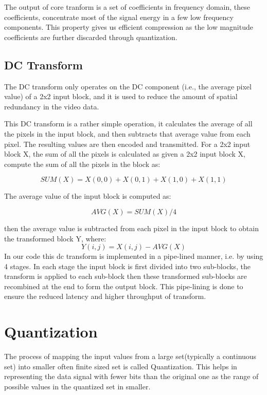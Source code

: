 The output of core tranform is a set of coefficients in frequency domain, these coefficients, concentrate most of the signal energy in a few low frequency components. This property gives us efficient compression as the low magnitude coefficients are further discarded through quantization.

\subsection{DC Transform}
The DC transform only operates on the DC component (i.e., the average pixel value) of a 2x2 input block, and it is used to reduce the amount of spatial redundancy in the video data.

This DC transform is a rather simple operation, it calculates the average of all the pixels in the input block, and then subtracts that average value from each pixel. The resulting values are then encoded and transmitted. For a 2x2 input block X, the sum of all the pixels is calculated as given a 2x2 input block X, compute the sum of all the pixels in the block as: 

\begin{equation}
	SUM(X) = X(0,0) + X(0,1) + X(1,0) + X(1,1)
\end{equation}

The average value of the input block is computed as:

\begin{equation}
 AVG(X) = SUM(X) / 4
\end{equation}

then the average value is subtracted from each pixel in the input block to obtain the transformed block Y, where:
\begin{equation}
 	Y(i,j) = X(i,j) - AVG(X) 
\end{equation} 	
In our code this dc transform is implemented in a pipe-lined manner, i.e. by using 4 stages. In each stage the input block is first divided into two sub-blocks, the transform is applied to each sub-block then these transformed sub-blocks are recombined at the end to form the output block. This pipe-lining is done to ensure the reduced latency and higher throughput of transform. 


\section{Quantization}
The process of mapping the input values from a large set(typically a continuous set) into smaller often finite sized set is called Quantization. This helps in representing the data signal with fewer bits than the original one as the range of possible values in the quantized set in smaller.


